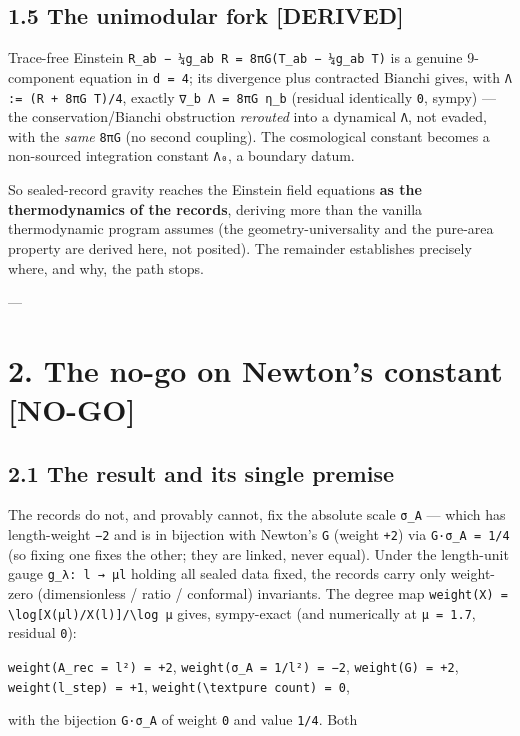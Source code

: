 \documentclass[11pt]{article}
\begin{document}
\subsection*{1.5 The unimodular fork [DERIVED]}
Trace-free Einstein \texttt{R\_ab − ¼g\_ab R = 8πG(T\_ab − ¼g\_ab T)} is a genuine 9-component equation in \texttt{d = 4}; its divergence plus contracted Bianchi gives, with \texttt{Λ := (R + 8πG T)/4}, exactly \texttt{∇\_b Λ = 8πG η\_b} (residual identically \texttt{0}, sympy) — the conservation/Bianchi obstruction \emph{rerouted} into a dynamical \texttt{Λ}, not evaded, with the \emph{same} \texttt{8πG} (no second coupling). The cosmological constant becomes a non-sourced integration constant \texttt{Λ₀}, a boundary datum.

So sealed-record gravity reaches the Einstein field equations \textbf{as the thermodynamics of the records}, deriving more than the vanilla thermodynamic program assumes (the geometry-universality and the pure-area property are derived here, not posited). The remainder establishes precisely where, and why, the path stops.

---

\section*{2. The no-go on Newton's constant [NO-GO]}
\subsection*{2.1 The result and its single premise}
The records do not, and provably cannot, fix the absolute scale \texttt{σ\_A} — which has length-weight \texttt{−2} and is in bijection with Newton's \texttt{G} (weight \texttt{+2}) via \texttt{G·σ\_A = 1/4} (so fixing one fixes the other; they are linked, never equal). Under the length-unit gauge \texttt{g\_λ: l → μl} holding all sealed data fixed, the records carry only weight-zero (dimensionless / ratio / conformal) invariants. The degree map \texttt{weight(X) = \textbackslash{}log[X(μl)/X(l)]/\textbackslash{}log μ} gives, sympy-exact (and numerically at \texttt{μ = 1.7}, residual \texttt{0}):

\texttt{weight(A\_rec = l²) = +2},  \texttt{weight(σ\_A = 1/l²) = −2},  \texttt{weight(G) = +2},  \texttt{weight(l\_step) = +1},  \texttt{weight(\textbackslash{}text{pure count}) = 0},

with the bijection \texttt{G·σ\_A} of weight \texttt{0} and value \texttt{1/4}. Both
\end{document}
